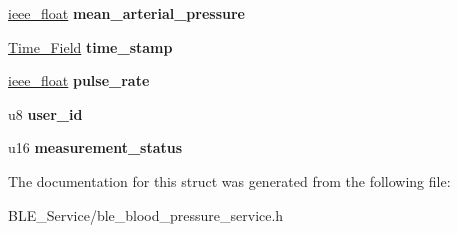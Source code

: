 \begin{DoxyCompactItemize}
\item 
\hyperlink{structieee__float}{ieee\+\_\+float} {\bfseries mean\+\_\+arterial\+\_\+pressure}\hypertarget{struct_b_l_e___b_p_s___measurement_a054bed4ed88ed5623255567b7589ee27}{}\label{struct_b_l_e___b_p_s___measurement_a054bed4ed88ed5623255567b7589ee27}

\item 
\hyperlink{struct_time___field}{Time\+\_\+\+Field} {\bfseries time\+\_\+stamp}\hypertarget{struct_b_l_e___b_p_s___measurement_aa9c13c0f93c5f2648c3ddf7d007375ae}{}\label{struct_b_l_e___b_p_s___measurement_aa9c13c0f93c5f2648c3ddf7d007375ae}

\item 
\hyperlink{structieee__float}{ieee\+\_\+float} {\bfseries pulse\+\_\+rate}\hypertarget{struct_b_l_e___b_p_s___measurement_a78930a13253d3f18bf4b9bca81b8936a}{}\label{struct_b_l_e___b_p_s___measurement_a78930a13253d3f18bf4b9bca81b8936a}

\item 
u8 {\bfseries user\+\_\+id}\hypertarget{struct_b_l_e___b_p_s___measurement_a1e9c8adcc21da60a64ba8927b0b57166}{}\label{struct_b_l_e___b_p_s___measurement_a1e9c8adcc21da60a64ba8927b0b57166}

\item 
u16 {\bfseries measurement\+\_\+status}\hypertarget{struct_b_l_e___b_p_s___measurement_a297ebfbfbfb802fba71a80fb675d05b4}{}\label{struct_b_l_e___b_p_s___measurement_a297ebfbfbfb802fba71a80fb675d05b4}

\end{DoxyCompactItemize}


The documentation for this struct was generated from the following file\+:\begin{DoxyCompactItemize}
\item 
B\+L\+E\+\_\+\+Service/ble\+\_\+blood\+\_\+pressure\+\_\+service.\+h\end{DoxyCompactItemize}
